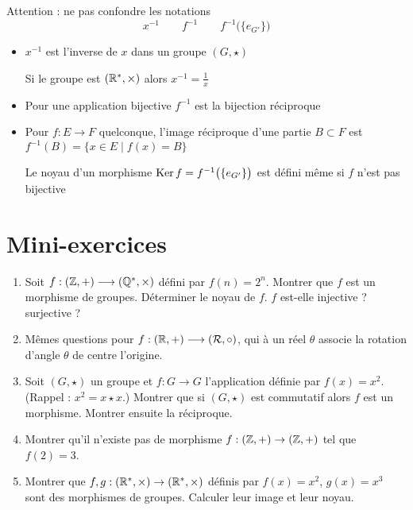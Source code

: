 \begin{frame}
Attention : ne pas confondre les notations
$$x^{-1}\qquad  f^{-1} \qquad f^{-1}\big(\{ e_{G'} \}\big)$$
\pause
\begin{itemize}
  \item $x^{-1}$ est l'inverse de $x$ dans un groupe $(G,\star)$

Si le groupe est $(\mathbb{R}^*,\times)$ alors $x^{-1}=\frac 1 x$
\pause

  \item Pour une application bijective $f^{-1}$ est la bijection réciproque
\pause

  \item Pour $f : E \longrightarrow F$ quelconque, l'image réciproque d'une partie $B\subset F$ est 
$f^{-1}(B) = \big\{ x \in E \mid f(x) = B \big\}$


Le noyau d'un morphisme $\mathop{\text{Ker}}\nolimits f = f^{-1}\big(\{ e_{G'} \}\big)$ est défini même si $f$ n'est pas bijective
\end{itemize}  
\end{frame}



\section*{Mini-exercices}

\begin{frame}

\begin{miniexercice}
\begin{enumerate}
  \item Soit $f : (\mathbb{Z},+) \longrightarrow (\mathbb{Q}^*,\times)$ défini par $f(n)=2^n$. Montrer que 
$f$ est un morphisme de groupes. Déterminer le noyau de $f$. $f$ est-elle injective ? surjective ?

  \item Mêmes questions pour $f : (\mathbb{R},+) \longrightarrow (\mathcal{R},\circ)$, qui à un réel
$\theta$ associe la rotation d'angle $\theta$ de centre l'origine. 

  \item Soit $(G,\star)$ un groupe et $f : G \longrightarrow G$ l'application définie par
$f(x)=x^2$. (Rappel : $x^2=x\star x$.) Montrer que si $(G,\star)$ est commutatif alors $f$
est un morphisme. Montrer ensuite la réciproque.
  \item Montrer qu'il n'existe pas de morphisme $f : (\mathbb{Z},+) \to (\mathbb{Z},+)$ tel que $f(2)=3$.
  \item Montrer que $f, g : (\mathbb{R}^*,\times) \to (\mathbb{R}^*,\times)$ définis par $f(x)=x^2$,
$g(x)=x^3$ sont des morphismes de groupes. Calculer leur image et leur noyau.
\end{enumerate}


\end{miniexercice}
\end{frame}


